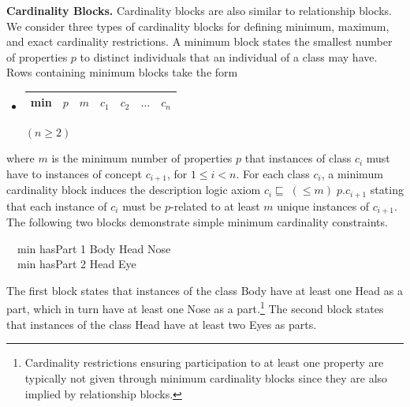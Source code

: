 \documentclass[preprint,number]{elsarticle}
\newcommand{\myblock}[1]{\vspace{12pt}\noindent\textbf{#1}}
\begin{document}
\myblock{Cardinality Blocks.} Cardinality blocks are also similar to
relationship blocks.  We consider three types of cardinality blocks
for defining minimum, maximum, and exact cardinality restrictions. A
minimum block states the smallest number of properties $p$ to distinct
individuals that an individual of a class may have.  Rows containing
minimum blocks take the form
\begin{itemize}
\item[]
  \begin{tabular}{|l|l|l|l|l|l|l|}\hline \textsf{min} & $p$ & $m$ & 
    $c_1$ & $c_2$ & $\dots$ & $c_n$
    \\ \hline 
  \end{tabular} \hfill $(n \ge 2)$
\end{itemize}
where $m$ is the minimum number of properties $p$ that instances of
class $c_i$ must have to instances of concept $c_{i+1}$, for $1 \le i
< n$.  For each class $c_i$, a minimum cardinality block induces the
description logic axiom $c_{i} \sqsubseteq \; (\le m) \; p.c_{i+1}$
stating that each instance of $c_i$ must be $p$-related to at least
$m$ unique instances of $c_{i+1}$. The following two blocks
demonstrate simple minimum cardinality constraints.
\begin{tabbing}
  ~~\textsf{min} \textsf{hasPart} 1 \textsf{Body} \textsf{Head} 
  \textsf{Nose} \\
  ~~\textsf{min} \textsf{hasPart} 2 \textsf{Head} \textsf{Eye}
\end{tabbing}
The first block states that instances of the class Body have at least
one Head as a part, which in turn have at least one Nose as a
part.\footnote{Cardinality restrictions ensuring participation to at
  least one property are typically not given through minimum
  cardinality blocks since they are also implied by relationship
  blocks.} The second block states that instances of the class Head
have at least two Eyes as parts. 
\end{document}
